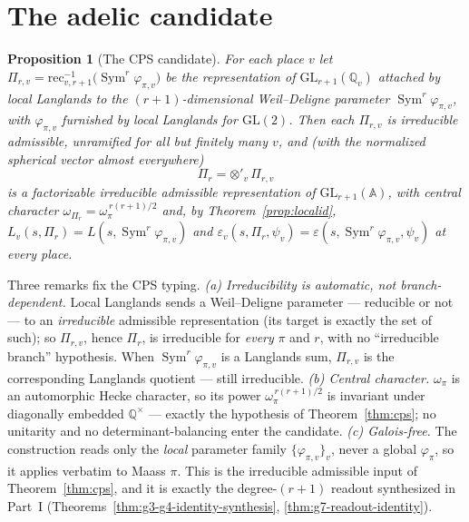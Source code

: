 \documentclass[11pt]{article}
\newtheorem{proposition}[theorem]{Proposition}
\theoremstyle{definition}
\newcommand{\Sym}{\operatorname{Sym}}
\begin{document}
\section{The adelic candidate}\label{sec:cps-cand}
\begin{proposition}[The CPS candidate]\label{prop:cps-cand}
For each place $v$ let $\Pi_{r,v}=\mathrm{rec}_{v,r+1}^{-1}\bigl(\Sym^r\varphi_{\pi,v}\bigr)$ be the
representation of $\mathrm{GL}_{r+1}(\mathbb Q_v)$ attached by local Langlands to the $(r+1)$-dimensional
Weil--Deligne parameter $\Sym^r\varphi_{\pi,v}$, with $\varphi_{\pi,v}$ furnished by local Langlands for
$\mathrm{GL}(2)$. Then each $\Pi_{r,v}$ is \emph{irreducible admissible}, unramified for all but finitely many
$v$, and (with the normalized spherical vector almost everywhere)
\[
  \Pi_r=\otimes'_v\,\Pi_{r,v}
\]
is a factorizable \emph{irreducible admissible} representation of $\mathrm{GL}_{r+1}(\mathbb A)$, with central
character $\omega_{\Pi_r}=\omega_\pi^{\,r(r+1)/2}$ and, by Theorem~\ref{prop:localid},
$L_v(s,\Pi_r)=L(s,\Sym^r\varphi_{\pi,v})$ and
$\varepsilon_v(s,\Pi_r,\psi_v)=\varepsilon(s,\Sym^r\varphi_{\pi,v},\psi_v)$ at every place.
\end{proposition}
\noindent Three remarks fix the CPS typing. \emph{(a) Irreducibility is automatic, not branch-dependent.}
Local Langlands sends a Weil--Deligne parameter --- reducible or not --- to an \emph{irreducible} admissible
representation (its target is exactly the set of such); so $\Pi_{r,v}$, hence $\Pi_r$, is irreducible for
\emph{every} $\pi$ and $r$, with no ``irreducible branch'' hypothesis. When $\Sym^r\varphi_{\pi,v}$ is a
Langlands sum, $\Pi_{r,v}$ is the corresponding Langlands quotient --- still irreducible. \emph{(b) Central
character.} $\omega_\pi$ is an automorphic Hecke character, so its power $\omega_\pi^{\,r(r+1)/2}$ is invariant
under diagonally embedded $\mathbb Q^\times$ --- exactly the hypothesis of Theorem~\ref{thm:cps}; no unitarity
and no determinant-balancing enter the candidate. \emph{(c) Galois-free.} The construction reads only the
\emph{local} parameter family $\{\varphi_{\pi,v}\}_v$, never a global $\varphi_\pi$, so it applies verbatim to
Maass $\pi$. This is the irreducible admissible input of Theorem~\ref{thm:cps}, and it is exactly the
degree-$(r+1)$ readout synthesized in Part~I (Theorems~\ref{thm:g3-g4-identity-synthesis},
\ref{thm:g7-readout-identity}).
\end{document}
